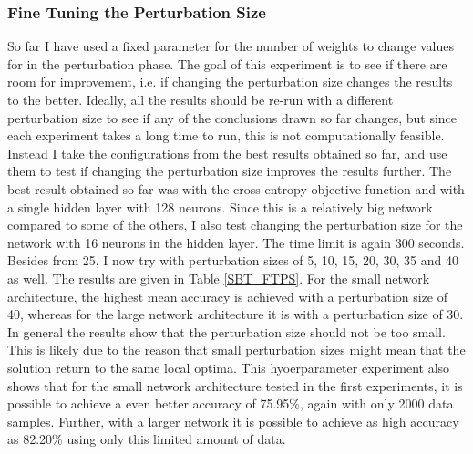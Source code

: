 \subsubsection{Fine Tuning the Perturbation Size}

\noindent So far I have used a fixed parameter for the number of weights to change values for in the perturbation phase. The goal of this experiment is to see if there are room for improvement, i.e. if changing the perturbation size changes the results to the better. Ideally, all the results should be re-run with a different perturbation size to see if any of the conclusions drawn so far changes, but since each experiment takes a long time to run, this is not computationally feasible. Instead I take the configurations from the best results obtained so far, and use them to test if changing the perturbation size improves the results further. The best result obtained so far was with the cross entropy objective function and with a single hidden layer with 128 neurons. Since this is a relatively big network compared to some of the others, I also test changing the perturbation size for the network with 16 neurons in the hidden layer. The time limit is again 300 seconds. Besides from 25, I now try with perturbation sizes of 5, 10, 15, 20, 30, 35 and 40 as well. The results are given in Table \ref{SBT_FTPS}. For the small network architecture, the highest mean accuracy is achieved with a perturbation size of 40, whereas for the large network architecture it is with a perturbation size of 30. In general the results show that the perturbation size should not be too small. This is likely due to the reason that small perturbation sizes might mean that the solution return to the same local optima. This hyoerparameter experiment also shows that for the small network architecture tested in the first experiments, it is possible to achieve a even better accuracy of 75.95\%, again with only 2000 data samples. Further, with a larger network it is possible to achieve as high accuracy as 82.20\% using only this limited amount of data. 



